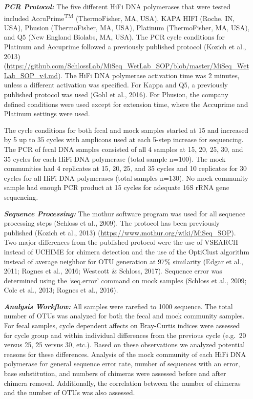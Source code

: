 \documentclass[12pt,]{article}
\begin{document}
\textbf{\emph{PCR Protocol:}} The five different HiFi DNA polymerases
that were tested included AccuPrime\textsuperscript{TM} (ThermoFisher,
MA, USA), KAPA HIFI (Roche, IN, USA), Phusion (ThermoFisher, MA, USA),
Platinum (ThermoFisher, MA, USA), and Q5 (New England Biolabs, MA, USA).
The PCR cycle conditions for Platinum and Accuprime followed a
previously published protocol (Kozich et al., 2013)
(\url{https://github.com/SchlossLab/MiSeq_WetLab_SOP/blob/master/MiSeq_WetLab_SOP_v4.md}).
The HiFi DNA polymerase activation time was 2 minutes, unless a
different activation was specified. For Kappa and Q5, a previously
published protocol was used (Gohl et al., 2016). For Phusion, the
company defined conditions were used except for extension time, where
the Accuprime and Platinum settings were used.

The cycle conditions for both fecal and mock samples started at 15 and
increased by 5 up to 35 cycles with amplicons used at each 5-step
increase for sequencing. The PCR of fecal DNA samples consisted of all 4
samples at 15, 20, 25, 30, and 35 cycles for each HiFi DNA polymerase
(total sample n=100). The mock communities had 4 replicates at 15, 20,
25, and 35 cycles and 10 replicates for 30 cycles for all HiFi DNA
polymerases (total samples n=130). No mock community sample had enough
PCR product at 15 cycles for adequate 16S rRNA gene sequencing.

\textbf{\emph{Sequence Processing:}} The mothur software program was
used for all sequence processing steps (Schloss et al., 2009). The
protocol has been previously published (Kozich et al., 2013)
(\url{https://www.mothur.org/wiki/MiSeq_SOP}). Two major differences
from the published protocol were the use of VSEARCH instead of UCHIME
for chimera detection and the use of the OptiClust algorithm instead of
average neighbor for OTU generation at 97\% similarity (Edgar et al.,
2011; Rognes et al., 2016; Westcott \& Schloss, 2017). Sequence error
was determined using the `seq.error' command on mock samples (Schloss et
al., 2009; Cole et al., 2013; Rognes et al., 2016).

\textbf{\emph{Analysis Workflow:}} All samples were rarefied to 1000
sequence. The total number of OTUs was analyzed for both the fecal and
mock community samples. For fecal samples, cycle dependent affects on
Bray-Curtis indices were assessed for cycle group and within individual
differences from the previous cycle (e.g.~20 versus 25, 25 versus 30,
etc.). Based on these observations we analyzed potential reasons for
these differences. Analysis of the mock community of each HiFi DNA
polymerase for general sequence error rate, number of sequences with an
error, base substitution, and numbers of chimeras were assessed before
and after chimera removal. Additionally, the correlation between the
number of chimeras and the number of OTUs was also assessed.
\end{document}
